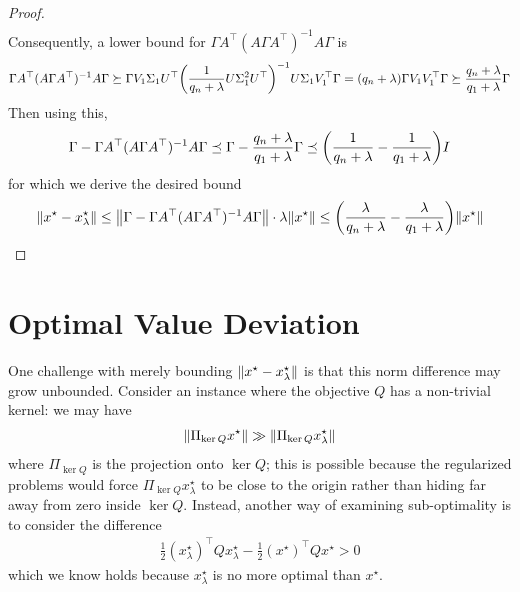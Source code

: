 \documentclass[12pt]{article}
\begin{document}
\begin{proof}
\begin{align*}
  \end{align*}
  Consequently, a lower bound for
  \(\Gamma A^\top (A \Gamma A^\top)^{-1} A \Gamma\) is
  \begin{align*}
    \Gamma A^\top (A \Gamma A^\top)^{-1} A \Gamma
      \succeq
        \Gamma V_1 \Sigma_1 U^\top
          {\left(\frac{1}{q_n + \lambda} U \Sigma_1 ^2 U^\top\right)}^{-1}
          U \Sigma_1 V_1 ^\top \Gamma
      = {\left(q_n + \lambda\right)}
          \Gamma V_1 V_1 ^\top \Gamma
      \succeq \frac{q_n + \lambda}{q_1 + \lambda} \Gamma
  \end{align*}
  Then using this,
  \begin{align*}
    \Gamma - \Gamma A^\top (A \Gamma A^\top)^{-1} A \Gamma
      \preceq \Gamma - \frac{q_n + \lambda}{q_1 + \lambda} \Gamma
      \preceq {\left(\frac{1}{q_n + \lambda} - \frac{1}{q_1 + \lambda}\right)} I
  \end{align*}
  for which we derive the desired bound
  \begin{align*}
    {\left\lVert x^\star - x_\lambda ^\star\right\rVert}
      \leq {\left\lVert\Gamma - \Gamma A^\top (A \Gamma A^\top)^{-1} A \Gamma\right\rVert}
          \cdot \lambda {\left\lVert x^\star\right\rVert}
      \leq {\left(\frac{\lambda}{q_n + \lambda}
                - \frac{\lambda}{q_1 + \lambda}\right)}
              {\left\lVert x^\star\right\rVert}
  \end{align*}

\end{proof}

\section{Optimal Value Deviation}
One challenge with merely bounding
\({\left\lVert x^\star - x_\lambda ^\star\right\rVert}\) is that
this norm difference may grow unbounded.
Consider an instance where the objective \(Q\) has a non-trivial kernel:
we may have
\begin{align*}
  {\left\lVert\Pi_{\operatorname{ker}Q} x^\star\right\rVert} \gg
  {\left\lVert\Pi_{\operatorname{ker}Q} x_\lambda ^\star\right\rVert}
\end{align*}
where \(\Pi_{\ker Q}\) is the projection onto \(\ker Q\);
this is possible because the regularized problems would force
\(\Pi_{\ker Q} x_\lambda ^\star\) to be close to the origin
rather than hiding far away from zero inside \(\ker Q\).
Instead, another way of examining sub-optimality is to consider the 
difference
\begin{align*}
  \frac{1}{2} (x_\lambda ^\star)^\top Q x_\lambda ^\star
    - \frac{1}{2} (x^\star)^\top Q x^\star
    > 0
\end{align*}
which we know holds because \(x_\lambda ^\star\) is no more optimal
than \(x^\star\).
\end{document}
